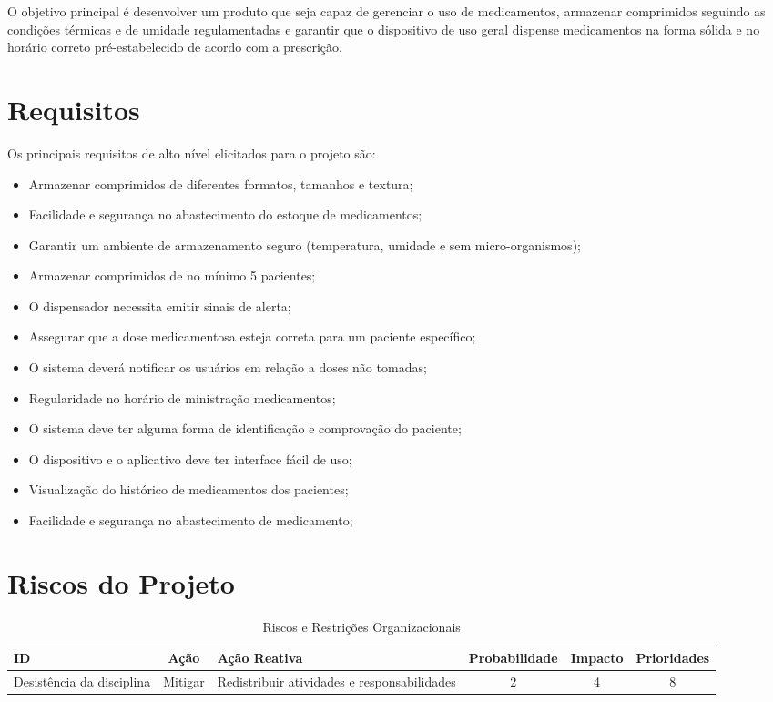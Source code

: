 \begin{apendicesenv}
O objetivo principal é desenvolver um produto que seja capaz de gerenciar o uso de medicamentos, armazenar comprimidos seguindo as condições térmicas e de umidade regulamentadas e garantir que o dispositivo de uso geral dispense medicamentos na forma sólida e no horário correto pré-estabelecido de acordo com a prescrição. 


\section{Requisitos}
Os principais requisitos de alto nível elicitados para o projeto são:

\begin{itemize}
\item Armazenar comprimidos de diferentes formatos, tamanhos e textura;
\item Facilidade e segurança no abastecimento do estoque de medicamentos;
\item Garantir um ambiente de armazenamento seguro (temperatura, umidade e sem micro-organismos);
\item Armazenar comprimidos de no mínimo 5 pacientes;
\item O dispensador necessita emitir sinais de alerta;
\item Assegurar que a dose medicamentosa esteja correta para um paciente específico;
\item O sistema deverá notificar os usuários em relação a doses não tomadas;
\item Regularidade no horário de ministração medicamentos;
\item O sistema deve ter alguma forma de identificação e comprovação do paciente;
\item O dispositivo e o aplicativo deve ter interface fácil de uso;
\item Visualização do histórico de medicamentos dos pacientes;
\item Facilidade e segurança no abastecimento de medicamento;
\end{itemize}

\section{Riscos do Projeto}


\begin{table}[H]
    \centering
    \caption{Riscos e Restrições Organizacionais}
    \label{tab:tap-riscos}
    \begin{adjustbox}{max width = \textwidth}
        \begin{tabular}{|L{5cm}|c|L{4cm}|c|c|c|}
            \hline
            \textbf{ID} & \textbf{Ação} & \textbf{Ação Reativa} & \textbf{Probabilidade} & \textbf{Impacto} & \textbf{Prioridades}\\ \hline
             Desistência da disciplina  & Mitigar & Redistribuir atividades e responsabilidades & 2 & 4 & 8 \\ \hline
        

\end{tabular}
\end{adjustbox}
\end{table}
\end{apendicesenv}
